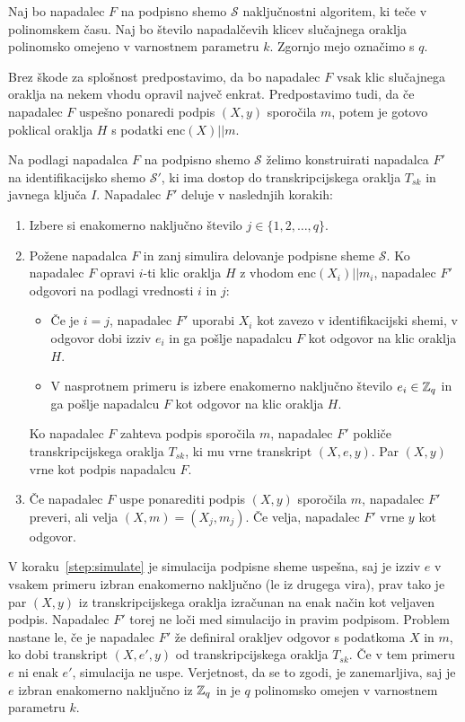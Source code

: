 \begin{dokaz}
    Naj bo napadalec $F$ na podpisno shemo $\mathcal{S}$ naključnostni algoritem, ki teče v
    polinomskem času. Naj bo število napadalčevih klicev slučajnega oraklja polinomsko omejeno
    v varnostnem parametru $k$. Zgornjo mejo označimo s $q$.

    Brez škode za splošnost predpostavimo, da bo napadalec $F$ vsak klic slučajnega oraklja na
    nekem vhodu opravil največ enkrat. Predpostavimo tudi, da če napadalec $F$ uspešno ponaredi
    podpis $(X, y)$ sporočila $m$, potem je gotovo poklical oraklja $H$ s podatki $\text{enc}(X) || m$.

    Na podlagi napadalca $F$ na podpisno shemo $\mathcal{S}$ želimo konstruirati napadalca $F'$
    na identifikacijsko shemo $\mathcal{S'}$, ki ima dostop do transkripcijskega oraklja $T_{sk}$
    in javnega ključa $I$. Napadalec $F'$ deluje v naslednjih korakih:
    \begin{enumerate}
        \item Izbere si enakomerno naključno število $j \in \{1, 2, \dots, q\}$.
        \item Požene napadalca $F$ in zanj simulira delovanje podpisne sheme $\mathcal{S}$.
            Ko napadalec $F$ opravi $i$-ti klic oraklja $H$ z vhodom $\text{enc}(X_i) || m_i$,
            napadalec $F'$ odgovori na podlagi vrednosti $i$ in $j$:
            \begin{itemize}
                \item Če je $i = j$, napadalec $F'$ uporabi $X_i$ kot zavezo v identifikacijski
                    shemi, v odgovor dobi izziv $e_i$ in ga pošlje napadalcu $F$ kot odgovor na
                    klic oraklja $H$.
                \item V nasprotnem primeru is izbere enakomerno naključno število $e_i \in \mathbb Z_q$ in ga
                    pošlje napadalcu $F$ kot odgovor na klic oraklja $H$.
            \end{itemize}
            Ko napadalec $F$ zahteva podpis sporočila $m$, napadalec $F'$ pokliče transkripcijskega
            oraklja $T_{sk}$, ki mu vrne transkript $(X, e, y)$. Par $(X, y)$ vrne kot podpis
            napadalcu $F$.
        \label{step:simulate}
        \item Če napadalec $F$ uspe ponarediti podpis $(X, y)$ sporočila $m$, napadalec $F'$ preveri,
            ali velja $(X, m) = (X_j, m_j)$. Če velja, napadalec $F'$ vrne $y$ kot odgovor.
    \end{enumerate}
    V koraku~\ref{step:simulate} je simulacija podpisne sheme uspešna, saj je izziv $e$ v vsakem
    primeru izbran enakomerno naključno (le iz drugega vira), prav tako je par $(X, y)$ iz
    transkripcijskega oraklja izračunan na enak način kot veljaven podpis. Napadalec $F'$ torej ne
    loči med simulacijo in pravim podpisom. Problem nastane le, če je napadalec $F'$ že definiral
    orakljev odgovor s podatkoma $X$ in $m$, ko dobi transkript $(X, e', y)$ od transkripcijskega
    oraklja $T_{sk}$. Če v tem primeru $e$ ni enak $e'$, simulacija ne uspe. Verjetnost, da se to
    zgodi, je zanemarljiva, saj je $e$ izbran enakomerno naključno iz $\mathbb Z_q$ in je $q$ polinomsko
    omejen v varnostnem parametru $k$.


\end{dokaz}
